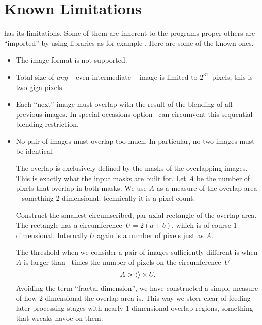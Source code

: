 

\chapter[Known Limitations]{\label{sec:known-limitations}%
  Known Limitations}

\App{} has its limitations.  Some of them are inherent to the programs proper others are
``imported'' by using libraries as for example .  Here are
some of the known ones.

\begin{itemize}
\item
  The  image format is not supported.

\item
  Total size of \emph{any} -- even intermediate -- image is limited to $2^{31}$~pixels, this is
  two giga-pixels.

\ifenblend
\item
  Each ``next'' image must overlap with the result of the blending of all previous images.  In
  special occasions option~ can circumvent this sequential-blending
  restriction.

\item
  No pair of images must overlap too much.  In particular, no two images must be identical.

  \begin{geeknote}
    The overlap is exclusively defined by the masks of the overlapping images.  This is exactly
    what the input masks are built for.  Let $A$ be the number of pixels that overlap in both
    masks.  We use $A$ as a measure of the overlap area -- something 2-dimensional; technically
    it is a pixel count.

    Construct the smallest circumscribed, par-axial rectangle of the overlap area.  The
    rectangle has a circumference~$U = 2 (a + b)$, which is of course 1-dimensional.  Internally
    $U$ again is a number of pixels just as $A$.

    The threshold when we consider a pair of images sufficiently different is when $A$ is larger
    than ~times the number of pixels on the circumference~$U$
    \[
    A > \val{val:overlap-check-threshold} \times U.
    \]
    Avoiding the term ``fractal dimension'', we have constructed a simple measure of how
    2-dimensional the overlap area is.  This way we steer clear of feeding later processing
    stages with nearly 1-dimensional overlap regions, something that wreaks havoc on them.
  \end{geeknote}


\end{itemize}
